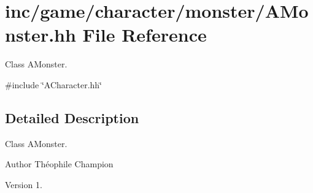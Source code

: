 \hypertarget{AMonster_8hh}{}\section{inc/game/character/monster/\+A\+Monster.hh File Reference}
\label{AMonster_8hh}


Class A\+Monster.  


{\ttfamily \#include \char`\"{}A\+Character.\+hh\char`\"{}}\newline


\subsection{Detailed Description}
Class A\+Monster. 

\begin{DoxyAuthor}{Author}
Théophile Champion 
\end{DoxyAuthor}
\begin{DoxyVersion}{Version}
1. 
\end{DoxyVersion}
